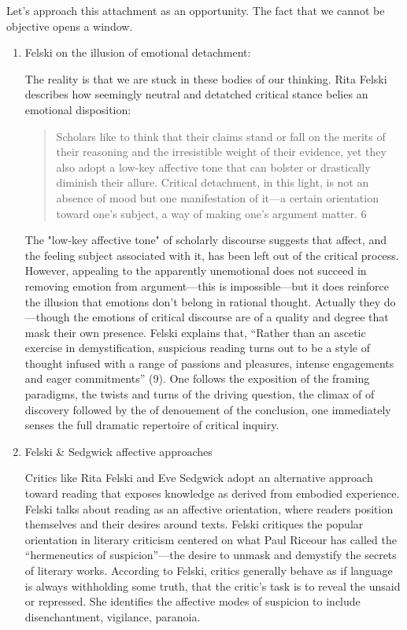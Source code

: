 \documentclass[11pt]{article}
\begin{document}
Let's approach this attachment as an opportunity. The fact that we
cannot be objective opens a window. 

\begin{enumerate}
\item Felski on the illusion of emotional detachment:
\label{sec:orge8c6863}

The reality is that we are stuck in these bodies of our thinking. Rita
Felski describes how seemingly neutral and detatched critical stance
belies an emotional disposition:

\begin{quote}
Scholars like to think that their claims stand or fall on the merits
of their reasoning and the irresistible weight of their evidence, yet
they also adopt a low-key affective tone that can bolster or
drastically diminish their allure. Critical detachment, in this light,
is not an absence of mood but one manifestation of it---a certain
orientation toward one's subject, a way of making one's argument
matter. 6
\end{quote}

The "low-key affective tone" of scholarly discourse suggests that
affect, and the feeling subject associated with it, has been left out
of the critical process. However, appealing to the apparently
unemotional does not succeed in removing emotion from argument---this
is impossible---but it does reinforce the illusion that emotions don't
belong in rational thought. Actually they do---though the emotions of
critical discourse are of a quality and degree that mask their own
presence. Felski explains that, “Rather than an ascetic exercise in
demystification, suspicious reading turns out to be a style of thought
infused with a range of passions and pleasures, intense engagements
and eager commitments” (9). One follows the exposition of the framing
paradigms, the twists and turns of the driving question, the climax of
of discovery followed by the of denouement of the conclusion, one
immediately senses the full dramatic repertoire of critical
inquiry. 

\item Felski \& Sedgwick affective approaches
\label{sec:orgac9b0d2}

Critics like Rita Felski and Eve Sedgwick adopt an alternative
approach toward reading that exposes knowledge as derived from
embodied experience. Felski talks about reading as an affective
orientation, where readers position themselves and their desires
around texts. Felski critiques the popular orientation in literary
criticism centered on what Paul Riceour has called the “hermeneutics
of suspicion”---the desire to unmask and demystify the secrets of
literary works. According to Felski, critics generally behave as if
language is always withholding some truth, that the critic’s task is
to reveal the unsaid or repressed. She identifies the affective modes
of suspicion to include disenchantment, vigilance, paranoia. 


\end{enumerate}
\end{document}

